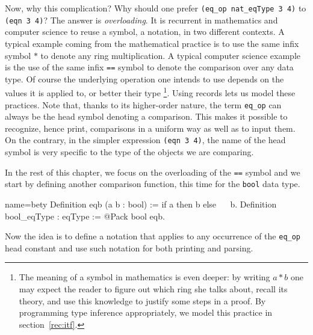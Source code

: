 Now, why this complication?  Why should one prefer
\lstinline/(eq_op nat_eqType 3 4)/ to \lstinline/(eqn 3 4)/?
The answer is \emph{overloading}.
It is recurrent in mathematics and computer science to reuse
a symbol, a notation, in two different contexts.  A typical
example coming from the mathematical practice is to use the same
infix symbol $*$ to denote any ring multiplication.  A typical
computer science example is the use of the same infix
\lstinline/==/ symbol to denote the comparison over any data type.
Of course the underlying operation one intends to use depends on
the values it is applied to, or better their type
\footnote{The meaning of a symbol in mathematics is even deeper: by
	writing $a * b$ one may expect the reader to figure out which
	ring she talks about, recall its theory, and use this
	knowledge to justify some steps in a proof.  By programming type
	inference appropriately, we model this practice
in section~\ref{rec:itf}.}.
Using records lets us model these practices.
Note that, thanks to its higher-order nature, the term \lstinline/eq_op/
can always be the head symbol denoting a comparison.  This makes
it possible to recognize, hence print, comparisons in a uniform way
as well as to input them.  On the contrary, in the simpler expression
\lstinline/(eqn 3 4)/, the name of the head symbol is very specific to
the type of the objects we are comparing.


In the rest of this chapter, we focus on the overloading of the
\lstinline/==/ symbol and we start by defining another comparison
function, this time for the \lstinline/bool/ data type.

\begin{coq}{name=bety}{}
Definition eqb (a b : bool) := if a then b else ~~ b.
Definition bool_eqType : eqType := @Pack bool eqb.
\end{coq}

Now the idea is to define a notation that applies to any occurrence
of the \lstinline/eq_op/ head constant and use such
notation for both printing and parsing.


